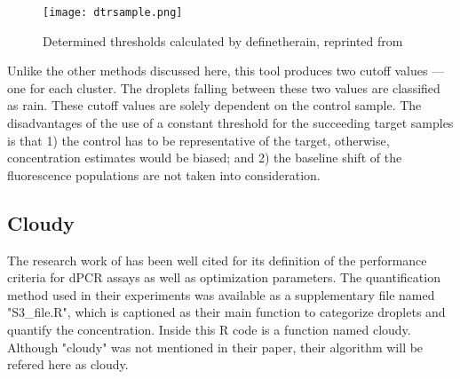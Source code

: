 \begin{figure}[h]
    \centering
    \texttt{[image: dtrsample.png]}
    \caption[Determined thresholds calculated by definetherain]{Determined thresholds calculated by definetherain, reprinted from \cite{jonesThreshold}}
        \label{fig:dtrsample}
\end{figure}

Unlike the other methods discussed here, this tool produces two cutoff values — one for each cluster. The droplets falling between these two values are classified as rain. These cutoff values are solely dependent on the control sample. The disadvantages of the use of a constant threshold for the succeeding target samples is that 1) the control has to be representative of the target, otherwise, concentration estimates would be biased; and 2) the baseline shift of the fluorescence populations are not taken into consideration.

\subsection{Cloudy}
\label{sec:peakdetectionkde}
The research work of  has been well cited for its definition of the performance criteria for dPCR assays as well as optimization parameters. The quantification method used in their experiments was available as a supplementary file named "S3\_file.R", which is captioned as their main function to categorize droplets and quantify the concentration. Inside this R code is a function named cloudy. Although "cloudy" was not mentioned in their paper, their algorithm will be refered here as cloudy. 

